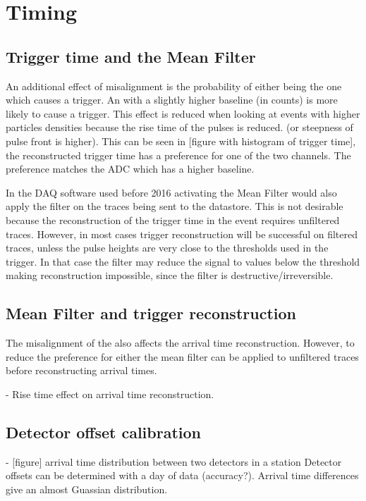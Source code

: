 \section{Timing}


\subsection{Trigger time and the Mean Filter}

An additional effect of misalignment is the probability of either \adc being the one which causes a trigger. An \adc with a slightly higher baseline (in \adc counts) is more likely to cause a trigger. This effect is reduced when looking at events with higher particles densities because the rise time of the pulses is reduced. (or steepness of pulse front is higher). This can be seen in [figure with histogram of trigger time], the reconstructed trigger time has a preference for one of the two channels. The preference matches the ADC which has a higher baseline.

In the DAQ software used before 2016 activating the Mean Filter would also apply the filter on the traces being sent to the datastore. This is not desirable because the reconstruction of the trigger time in the event requires unfiltered traces. However, in most cases trigger reconstruction will be successful on filtered traces, unless the pulse heights are very close to the thresholds used in the trigger. In that case the filter may reduce the signal to values below the threshold making reconstruction impossible, since the filter is destructive/irreversible.


\subsection{Mean Filter and trigger reconstruction}

The misalignment of the \adcs also affects the arrival time reconstruction. However, to reduce the preference for either \adc the mean filter can be applied to unfiltered traces before reconstructing arrival times.

- Rise time effect on arrival time reconstruction.


\subsection{Detector offset calibration}

- [figure] arrival time distribution between two detectors in a station
  Detector offsets can be determined with a day of data (accuracy?). Arrival
  time differences give an almost Guassian distribution.


